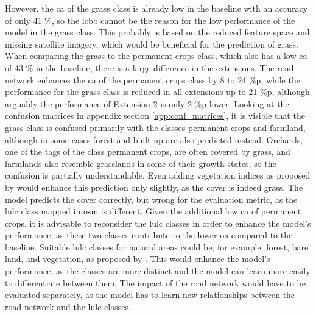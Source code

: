 However, the \gls{ca} of the grass class is already low in the baseline with an accuracy of only 41 \%, so the \gls{lcbb} cannot be the reason for the low performance of the model in the grass class. This probably is based on the reduced feature space and missing satellite imagery, which would be beneficial for the prediction of grass. When comparing the grass to the permanent crops class, which also has a low \gls{ca} of 43 \% in the baseline, there is a large difference in the extensions. The road network enhances the \gls{ca} of the permanent crops class by 8 to 24 \%p, while the performance for the grass class is reduced in all extensions up to 21 \%p, although arguably the performance of Extension 2 is only 2 \%p lower. Looking at the confusion matrices in appendix section \ref{app:conf_matrices}, it is visible that the grass class is confused primarily with the classes permanent crops and farmland, although in some cases forest and built-up are also predicted instead. Orchards, one of the tags of the class permanent crops, are often covered by grass, and farmlands also resemble grasslands in some of their growth states, so the confusion is partially understandable. Even adding vegetation indices as proposed by \textcite{Tzepkenlis.Marthoglou.ea2023} would enhance this prediction only slightly, as the cover is indeed grass. The model predicts the cover correctly, but wrong for the evaluation metric, as the \gls{lulc} class mapped in \gls{osm} is different. Given the additional low \gls{ca} of permanent crops, it is advisable to reconsider the \gls{lulc} classes in order to enhance the model's performance, as these two classes contribute to the lower \gls{oa} compared to the baseline. Suitable \gls{lulc} classes for natural areas could be, for example, forest, bare land, and vegetation, as proposed by \textcite{Basheer.Wang.ea2022}. This would enhance the model's performance, as the classes are more distinct and the model can learn more easily to differentiate between them. The impact of the road network would have to be evaluated separately, as the model has to learn new relationships between the road network and the \gls{lulc} classes.

